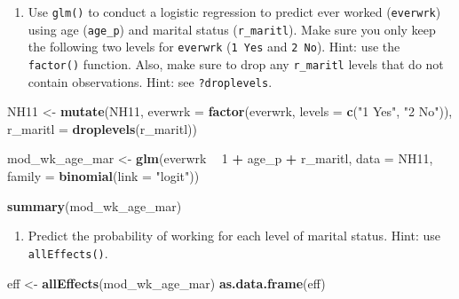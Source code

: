 \documentclass[
]{book}
\newenvironment{Shaded}{\begin{snugshade}}{\end{snugshade}}
\newcommand{\DataTypeTok}[1]{\textcolor[rgb]{0.13,0.29,0.53}{#1}}
\newcommand{\DecValTok}[1]{\textcolor[rgb]{0.00,0.00,0.81}{#1}}
\newcommand{\KeywordTok}[1]{\textcolor[rgb]{0.13,0.29,0.53}{\textbf{#1}}}
\newcommand{\NormalTok}[1]{#1}
\newcommand{\OperatorTok}[1]{\textcolor[rgb]{0.81,0.36,0.00}{\textbf{#1}}}
\newcommand{\StringTok}[1]{\textcolor[rgb]{0.31,0.60,0.02}{#1}}
\providecommand{\tightlist}{%
  \setlength{\itemsep}{0pt}\setlength{\parskip}{0pt}}
\begin{document}
\begin{enumerate}
\def\labelenumi{\arabic{enumi}.}
\tightlist
\item
  Use \texttt{glm()} to conduct a logistic regression to predict ever worked (\texttt{everwrk}) using age (\texttt{age\_p}) and marital status (\texttt{r\_maritl}). Make sure you only keep the following two levels for \texttt{everwrk} (\texttt{1\ Yes} and \texttt{2\ No}). Hint: use the \texttt{factor()} function. Also, make sure to drop any \texttt{r\_maritl} levels that do not contain observations. Hint: see \texttt{?droplevels}.
\end{enumerate}

\begin{Shaded}
\begin{Highlighting}[]
\NormalTok{  NH11 <-}\StringTok{ }\KeywordTok{mutate}\NormalTok{(NH11,}
                     \DataTypeTok{everwrk =} \KeywordTok{factor}\NormalTok{(everwrk, }\DataTypeTok{levels =} \KeywordTok{c}\NormalTok{(}\StringTok{"1 Yes"}\NormalTok{, }\StringTok{"2 No"}\NormalTok{)),}
                     \DataTypeTok{r_maritl =} \KeywordTok{droplevels}\NormalTok{(r_maritl))}

\NormalTok{  mod_wk_age_mar <-}\StringTok{ }\KeywordTok{glm}\NormalTok{(everwrk }\OperatorTok{~}\StringTok{ }\DecValTok{1} \OperatorTok{+}\StringTok{ }\NormalTok{age_p }\OperatorTok{+}\StringTok{ }\NormalTok{r_maritl, }
                        \DataTypeTok{data =}\NormalTok{ NH11,}
                        \DataTypeTok{family =} \KeywordTok{binomial}\NormalTok{(}\DataTypeTok{link =} \StringTok{"logit"}\NormalTok{))}

  \KeywordTok{summary}\NormalTok{(mod_wk_age_mar)}
\end{Highlighting}
\end{Shaded}

\begin{enumerate}
\def\labelenumi{\arabic{enumi}.}
\setcounter{enumi}{1}
\tightlist
\item
  Predict the probability of working for each level of marital status. Hint: use \texttt{allEffects()}.
\end{enumerate}

\begin{Shaded}
\begin{Highlighting}[]
\NormalTok{  eff <-}\StringTok{ }\KeywordTok{allEffects}\NormalTok{(mod_wk_age_mar)}
  \KeywordTok{as.data.frame}\NormalTok{(eff)}
\end{Highlighting}
\end{Shaded}
\end{document}
